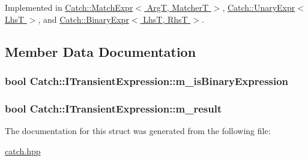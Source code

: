 Implemented in \hyperlink{class_catch_1_1_match_expr_ad3e41adb597750b2219bb37e51185629}{Catch\-::\-Match\-Expr$<$ Arg\-T, Matcher\-T $>$}, \hyperlink{class_catch_1_1_unary_expr_aaabf30455a996c80675c0f388a6e4110}{Catch\-::\-Unary\-Expr$<$ Lhs\-T $>$}, and \hyperlink{class_catch_1_1_binary_expr_af998022712d4bd3e4fc7ab9b8a38b445}{Catch\-::\-Binary\-Expr$<$ Lhs\-T, Rhs\-T $>$}.



\subsection{Member Data Documentation}
\hypertarget{struct_catch_1_1_i_transient_expression_a75ce48da824d514d08152d396abb28d8}{
\subsubsection[{m\-\_\-is\-Binary\-Expression}]{\setlength{\rightskip}{0pt plus 5cm}bool Catch\-::\-I\-Transient\-Expression\-::m\-\_\-is\-Binary\-Expression}}\label{struct_catch_1_1_i_transient_expression_a75ce48da824d514d08152d396abb28d8}
\hypertarget{struct_catch_1_1_i_transient_expression_a4646e2b5e0156e913653ec3b9b60c942}{
\subsubsection[{m\-\_\-result}]{\setlength{\rightskip}{0pt plus 5cm}bool Catch\-::\-I\-Transient\-Expression\-::m\-\_\-result}}\label{struct_catch_1_1_i_transient_expression_a4646e2b5e0156e913653ec3b9b60c942}


The documentation for this struct was generated from the following file\-:\begin{DoxyCompactItemize}
\item 
\hyperlink{catch_8hpp}{catch.\-hpp}\end{DoxyCompactItemize}
